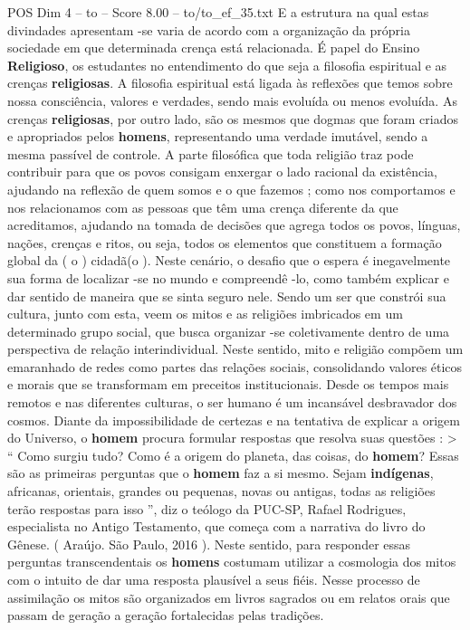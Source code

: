 \begin{textsample}{POS Dim 4 – to – Score 8.00 – to/to\_ef\_35.txt}
E a estrutura na qual estas divindades apresentam -se varia de acordo com a organização da própria sociedade em que determinada crença está relacionada.
É papel do Ensino \textbf{Religioso}, os estudantes no entendimento do que seja a filosofia espiritual e as crenças \textbf{religiosas}.
A filosofia espiritual está ligada às reflexões que temos sobre nossa consciência, valores e verdades, sendo mais evoluída ou menos evoluída.
As crenças \textbf{religiosas}, por outro lado, são os mesmos que dogmas que foram criados e apropriados pelos \textbf{homens}, representando uma verdade imutável, sendo a mesma passível de controle.
A parte filosófica que toda religião traz pode contribuir para que os povos consigam enxergar o lado racional da existência, ajudando na reflexão de quem somos e o que fazemos ; como nos comportamos e nos relacionamos com as pessoas que têm uma crença diferente da que acreditamos, ajudando na tomada de decisões que agrega todos os povos, línguas, nações, crenças e ritos, ou seja, todos os elementos que constituem a formação global da ( o ) cidadã(o ).
Neste cenário, o desafio que o espera é inegavelmente sua forma de localizar -se no mundo e compreendê -lo, como também explicar e dar sentido de maneira que se sinta seguro nele.
Sendo um ser que constrói sua cultura, junto com esta, veem os mitos e as religiões imbricados em um determinado grupo social, que busca organizar -se coletivamente dentro de uma perspectiva de relação interindividual.
Neste sentido, mito e religião compõem um emaranhado de redes como partes das relações sociais, consolidando valores éticos e morais que se transformam em preceitos institucionais.
Desde os tempos mais remotos e nas diferentes culturas, o ser humano é um incansável desbravador dos cosmos.
Diante da impossibilidade de certezas e na tentativa de explicar a origem do Universo, o \textbf{homem} procura formular respostas que resolva suas questões : > “ Como surgiu tudo?
Como é a origem do planeta, das coisas, do \textbf{homem}?
Essas são as primeiras perguntas que o \textbf{homem} faz a si mesmo.
Sejam \textbf{indígenas}, africanas, orientais, grandes ou pequenas, novas ou antigas, todas as religiões terão respostas para isso ”, diz o teólogo da PUC-SP, Rafael Rodrigues, especialista no Antigo Testamento, que começa com a narrativa do livro do Gênese. ( Araújo.
São Paulo, 2016 ).
Neste sentido, para responder essas perguntas transcendentais os \textbf{homens} costumam utilizar a cosmologia dos mitos com o intuito de dar uma resposta plausível a seus fiéis.
Nesse processo de assimilação os mitos são organizados em livros sagrados ou em relatos orais que passam de geração a geração fortalecidas pelas tradições.

\end{textsample}
